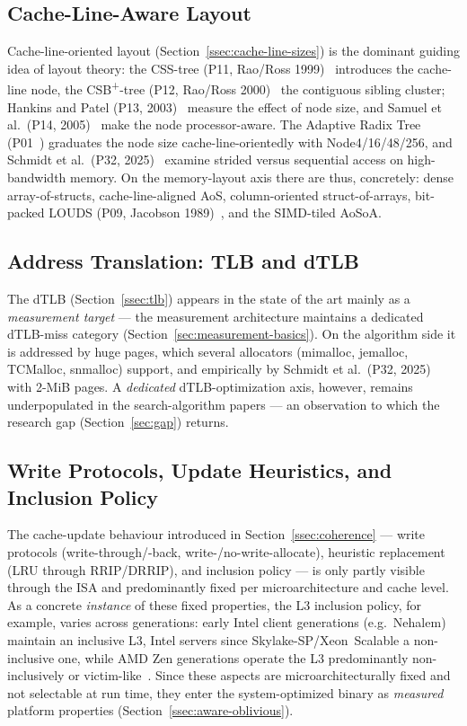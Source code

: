 \subsection{Cache-Line-Aware Layout}\label{ssec:sota-cacheline}
Cache-line-oriented layout (Section~\ref{ssec:cache-line-sizes}) is the dominant guiding idea of
layout theory: the CSS-tree (P11, Rao/Ross 1999)~\cite{rao1999css} introduces the cache-line node,
the CSB\textsuperscript{+}-tree (P12, Rao/Ross 2000)~\cite{rao2000csb} the contiguous sibling
cluster; Hankins and Patel (P13, 2003)~\cite{hankins2003nodesize} measure the effect of node size,
and Samuel et al.\ (P14, 2005)~\cite{samuel2005procaware} make the node processor-aware. The
Adaptive Radix Tree (P01~\cite{leis2013art}) graduates the node size cache-line-orientedly with
Node4/16/48/256, and Schmidt et al.\ (P32, 2025)~\cite{schmidt2025hbm} examine strided versus
sequential access on high-bandwidth memory. On the memory-layout axis there are thus, concretely:
dense array-of-structs, cache-line-aligned AoS, column-oriented struct-of-arrays, bit-packed LOUDS
(P09, Jacobson 1989)~\cite{jacobson1989louds}, and the SIMD-tiled AoSoA.

\subsection{Address Translation: TLB and dTLB}\label{ssec:sota-tlb}
The dTLB (Section~\ref{ssec:tlb}) appears in the state of the art mainly as a
\emph{measurement target} --- the measurement architecture maintains a dedicated dTLB-miss category
(Section~\ref{sec:measurement-basics}). On the algorithm side it is addressed by huge pages, which
several allocators (mimalloc, jemalloc, TCMalloc, snmalloc) support, and empirically by Schmidt et
al.\ (P32, 2025)~\cite{schmidt2025hbm} with 2-MiB pages. A \emph{dedicated} dTLB-optimization axis,
however, remains underpopulated in the search-algorithm papers --- an observation to which the
research gap (Section~\ref{sec:gap}) returns.

\subsection{Write Protocols, Update Heuristics, and Inclusion Policy}\label{ssec:sota-update}
The cache-update behaviour introduced in Section~\ref{ssec:coherence} --- write protocols
(write-through/-back, write-/no-write-allocate), heuristic replacement (LRU through RRIP/DRRIP), and
inclusion policy --- is only partly visible through the ISA and predominantly fixed per
microarchitecture and cache level. As a concrete \emph{instance} of these fixed properties, the L3
inclusion policy, for example, varies across generations: early Intel client generations
(e.g.\ Nehalem) maintain an inclusive L3, Intel servers since Skylake-SP/Xeon~Scalable a
non-inclusive one, while AMD Zen generations operate the L3 predominantly non-inclusively or
victim-like~\cite{intel_optimization,amd_sog}. Since these aspects are microarchitecturally fixed
and not selectable at run time, they enter the system-optimized binary as \emph{measured} platform
properties (Section~\ref{ssec:aware-oblivious}).

